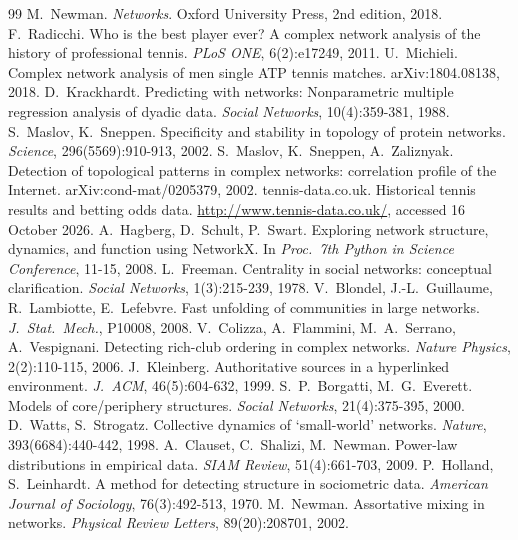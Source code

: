 \documentclass[12pt, a4paper]{article}
\begin{document}
\begin{thebibliography}{99}\scriptsize\setlength{\itemsep}{0pt}\setlength{\parskip}{0pt}
 M.~Newman. \emph{Networks}. Oxford University Press, 2nd edition, 2018.
 F.~Radicchi. Who is the best player ever? A complex network analysis of the history of professional tennis. \emph{PLoS ONE}, 6(2):e17249, 2011.
 U.~Michieli. Complex network analysis of men single ATP tennis matches. arXiv:1804.08138, 2018.
 D.~Krackhardt. Predicting with networks: Nonparametric multiple regression analysis of dyadic data. \emph{Social Networks}, 10(4):359-381, 1988.
 S.~Maslov, K.~Sneppen. Specificity and stability in topology of protein networks. \emph{Science}, 296(5569):910-913, 2002.
 S.~Maslov, K.~Sneppen, A.~Zaliznyak. Detection of topological patterns in complex networks: correlation profile of the Internet. arXiv:cond-mat/0205379, 2002.
 tennis-data.co.uk. Historical tennis results and betting odds data. \url{http://www.tennis-data.co.uk/}, accessed 16 October 2026.
 A.~Hagberg, D.~Schult, P.~Swart. Exploring network structure, dynamics, and function using NetworkX. In \emph{Proc.\ 7th Python in Science Conference}, 11-15, 2008.
 L.~Freeman. Centrality in social networks: conceptual clarification. \emph{Social Networks}, 1(3):215-239, 1978.
 V.~Blondel, J.-L.~Guillaume, R.~Lambiotte, E.~Lefebvre. Fast unfolding of communities in large networks. \emph{J.\ Stat.\ Mech.}, P10008, 2008.
 V.~Colizza, A.~Flammini, M.~A.~Serrano, A.~Vespignani. Detecting rich-club ordering in complex networks. \emph{Nature Physics}, 2(2):110-115, 2006.
 J.~Kleinberg. Authoritative sources in a hyperlinked environment. \emph{J.\ ACM}, 46(5):604-632, 1999.
 S.~P.~Borgatti, M.~G.~Everett. Models of core/periphery structures. \emph{Social Networks}, 21(4):375-395, 2000.
 D.~Watts, S.~Strogatz. Collective dynamics of `small-world' networks. \emph{Nature}, 393(6684):440-442, 1998.
 A.~Clauset, C.~Shalizi, M.~Newman. Power-law distributions in empirical data. \emph{SIAM Review}, 51(4):661-703, 2009.
 P.~Holland, S.~Leinhardt. A method for detecting structure in sociometric data. \emph{American Journal of Sociology}, 76(3):492-513, 1970.
 M.~Newman. Assortative mixing in networks. \emph{Physical Review Letters}, 89(20):208701, 2002.
\end{thebibliography}
\end{document}

